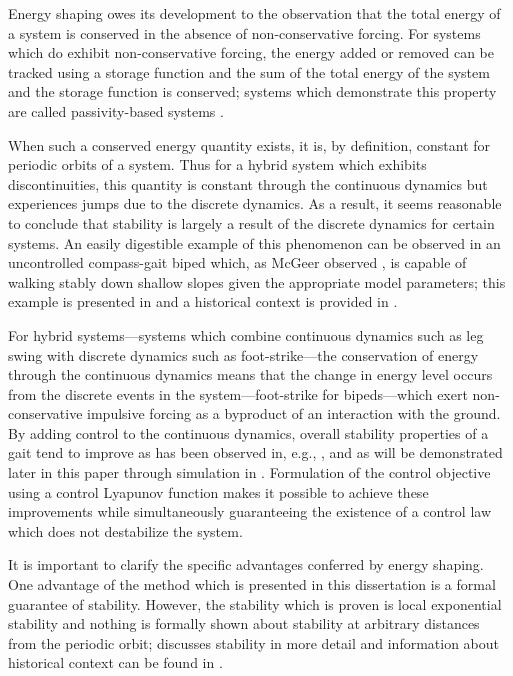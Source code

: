 Energy shaping owes its development to the observation that the total energy of
a system is conserved in the absence of non-conservative forcing.
%
For systems which do exhibit non-conservative forcing, the energy added or
removed can be tracked using a storage function and the sum of the total energy
of the system and the storage function is conserved;
%
systems which demonstrate this property are called passivity-based systems
\cite{Spong2007}.
%

When such a conserved energy quantity exists, it is, by definition, constant for
periodic orbits of a system.
%
Thus for a hybrid system which exhibits discontinuities, this quantity is
constant through the continuous dynamics but experiences jumps due to the
discrete dynamics.
%
As a result, it seems reasonable to conclude that stability is largely a result
of the discrete dynamics for certain systems.
%
An easily digestible example of this phenomenon can be observed in an
uncontrolled compass-gait biped which, as McGeer observed \cite{McGeer1990}, is
capable of walking stably down shallow slopes given the appropriate model
parameters;
%
this example is presented in  and a
historical context is provided in .

For hybrid systems---systems which combine continuous dynamics such as leg
swing with discrete dynamics such as foot-strike---the conservation of energy
through the continuous dynamics means that the change in energy level occurs
from the discrete events in the system---foot-strike for bipeds---which exert
non-conservative impulsive forcing as a byproduct of an interaction with the
ground.
%
By adding control to the continuous dynamics, overall stability properties of a
gait tend to improve as has been observed in, e.g., \cite{Spong2003}, and as will
be demonstrated later in this paper through simulation in
.
%
Formulation of the control objective using a control Lyapunov function makes it
possible to achieve these improvements while simultaneously guaranteeing the
existence of a control law which does not destabilize the system.

It is important to clarify the specific advantages conferred by energy shaping.
%
One advantage of the method which is presented in this dissertation is a formal
guarantee of stability.
%
However, the stability which is proven is local exponential stability and
nothing is formally shown about stability at arbitrary distances from the
periodic orbit;  discusses stability in more detail
and information about historical context can be found in
.

